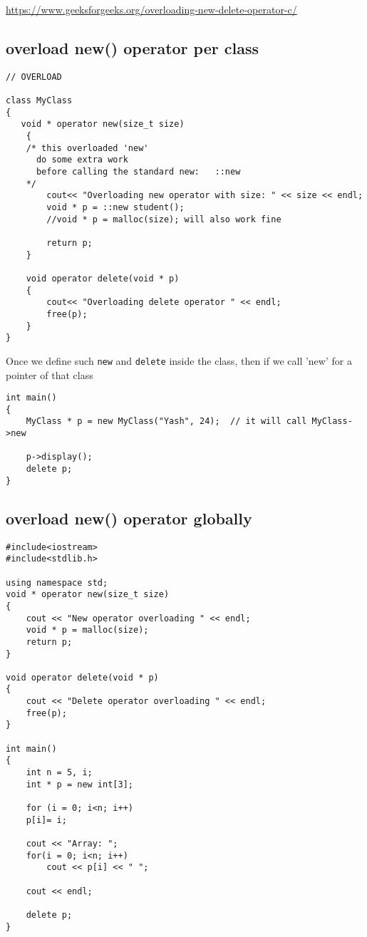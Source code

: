 \url{https://www.geeksforgeeks.org/overloading-new-delete-operator-c/}


\subsection{overload new() operator per class}
\label{sec:new()-overload-it-per-class}

\begin{lstlisting}
// OVERLOAD

class MyClass 
{
   void * operator new(size_t size) 
    { 
    /* this overloaded 'new'
      do some extra work
      before calling the standard new:   ::new
    */
        cout<< "Overloading new operator with size: " << size << endl; 
        void * p = ::new student();  
        //void * p = malloc(size); will also work fine 
      
        return p; 
    } 
  
    void operator delete(void * p) 
    { 
        cout<< "Overloading delete operator " << endl; 
        free(p); 
    } 
}
\end{lstlisting}

Once we define such \verb!new! and \verb!delete! inside the class, then if we call 'new' for a pointer of that class
\begin{lstlisting}
int main() 
{ 
    MyClass * p = new MyClass("Yash", 24);  // it will call MyClass->new
  
    p->display(); 
    delete p; 
} 
\end{lstlisting}

\subsection{overload new() operator globally}
\label{sec:new()-overload-it-globally}

\begin{lstlisting}
#include<iostream> 
#include<stdlib.h> 
  
using namespace std; 
void * operator new(size_t size) 
{ 
    cout << "New operator overloading " << endl; 
    void * p = malloc(size); 
    return p; 
} 
  
void operator delete(void * p) 
{ 
    cout << "Delete operator overloading " << endl; 
    free(p); 
} 
  
int main() 
{ 
    int n = 5, i; 
    int * p = new int[3]; 
  
    for (i = 0; i<n; i++) 
    p[i]= i; 
  
    cout << "Array: "; 
    for(i = 0; i<n; i++) 
        cout << p[i] << " "; 
          
    cout << endl; 
  
    delete p; 
} 
\end{lstlisting}


